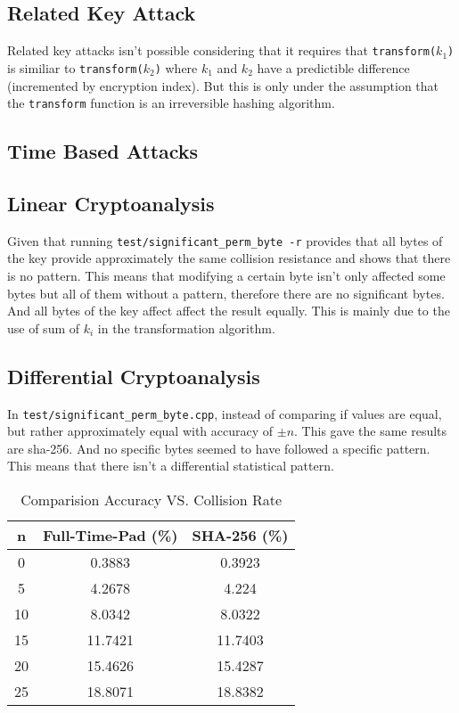 \documentclass[fleqn, a4paper,12pt]{article}
\begin{document}
\subsection{Related Key Attack}

Related key attacks isn't possible considering that it requires that \texttt{transform($k_1$)} is similiar to \texttt{transform($k_2$)} where $k_1$ and $k_2$ have a predictible difference (incremented by encryption index). But this is only under the assumption that the \texttt{transform} function is an irreversible hashing algorithm.

\subsection{Time Based Attacks}



\subsection{Linear Cryptoanalysis}

Given that running \texttt{test/significant\_perm\_byte -r} provides that all bytes of the key provide approximately the same collision resistance and shows that there is no pattern. This means that modifying a certain byte isn't only affected some bytes but all of them without a pattern, therefore there are no significant bytes. And all bytes of the key affect affect the result equally. This is mainly due to the use of sum of $k_i$ in the transformation algorithm.

\subsection{Differential Cryptoanalysis}

In \texttt{test/significant\_perm\_byte.cpp}, instead of comparing if values are equal, but rather approximately equal with accuracy of $\pm n$. This gave the same results are sha-256. And no specific bytes seemed to have followed a specific pattern. This means that there isn't a differential statistical pattern.

\begin{table}[h!]
\centering
\begin{tabular}{|c|c|c|}
\hline
\textbf{n} & \textbf{Full-Time-Pad (\%)} & \textbf{SHA-256 (\%)} \\
\hline
		0 & 0.3883 & 0.3923 \\
\hline
		5 & 4.2678 & 4.224 \\
\hline
		10 & 8.0342 & 8.0322 \\
\hline
		15 & 11.7421 & 11.7403 \\
\hline
		20 & 15.4626 & 15.4287 \\
\hline
		25 & 18.8071 & 18.8382 \\
\hline
\end{tabular}
\caption{Comparision Accuracy VS. Collision Rate}
\end{table}
\end{document}
